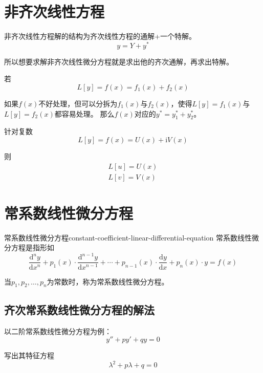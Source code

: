 \documentclass[math]{amznotes}
\begin{document}
\section{非齐次线性方程}
非齐次线性方程解的结构为齐次线性方程的通解+一个特解。
\begin{equation*}
	y = Y + y^*
\end{equation*}

所以想要求解非齐次线性微分方程就是求出他的齐次通解，再求出特解。

若\begin{equation*}
	L[y] = f(x) = f_1(x) + f_2(x)
\end{equation*}

如果$f(x)$不好处理，但可以分拆为$f_1(x)$与$f_2(x)$，使得$L[y] = f_1(x)$与$L[y] = f_2(x)$都容易处理。
那么$f(x)$对应的$y^* = y_1^* + y_2^*$。

针对复数\begin{equation*}
	L[y] = f(x) = U(x) + \mathrm{i} V(x)
\end{equation*}

则\begin{gather*}
	L[u] = U(x) \\
	L[v] = V(x)
\end{gather*}
\section{常系数\textbf{线性}微分方程}
\begin{dfnbox}
	{常系数线性微分方程}{constant-coefficient-linear-differential-equation}
	常系数线性微分方程是指形如
	\begin{equation*}
		\dfrac{\mathrm{d}^n y}{\mathrm{d}x^n} + p_1(x) \cdot \dfrac{\mathrm{d}^{n-1} y}{\mathrm{d}x^{n-1}} + \cdots + p_{n - 1}(x) \cdot \dfrac{\mathrm{d} y}{\mathrm{d}x} + p_n(x) \cdot y = f(x)
	\end{equation*}

	当$p_1, p_2, \ldots, p_n$为常数时，称为常系数线性微分方程。
\end{dfnbox}
\subsection{齐次常系数线性微分方程的解法}
以二阶常系数线性微分方程为例：
\begin{equation*}
	y'' + py' + qy = 0
\end{equation*}

写出其特征方程
\begin{equation*}
	\lambda^2 + p\lambda + q = 0
\end{equation*}
\end{document}
